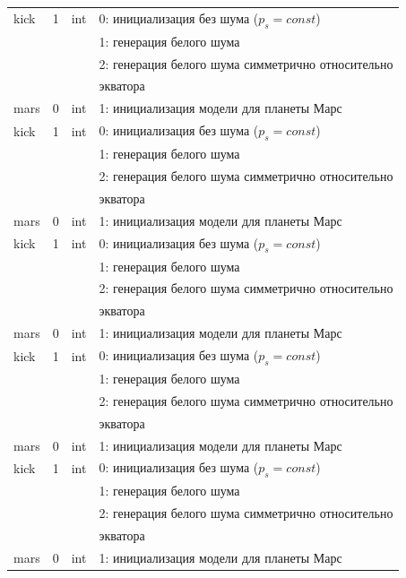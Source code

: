 \begin{longtable}[c]{|l|c|l|l|}
    kick     & 1      & int & 0: инициализация без шума (\(p_s = const\))       \\
             &        &     & 1: генерация белого шума                          \\
             &        &     & 2: генерация белого шума симметрично относительно \\
             &        &     & экватора                                          \\
    mars     & 0      & int & 1: инициализация модели для планеты Марс          \\
    kick     & 1      & int & 0: инициализация без шума (\(p_s = const\))       \\
             &        &     & 1: генерация белого шума                          \\
             &        &     & 2: генерация белого шума симметрично относительно \\
             &        &     & экватора                                          \\
    mars     & 0      & int & 1: инициализация модели для планеты Марс          \\
    kick     & 1      & int & 0: инициализация без шума (\(p_s = const\))       \\
             &        &     & 1: генерация белого шума                          \\
             &        &     & 2: генерация белого шума симметрично относительно \\
             &        &     & экватора                                          \\
    mars     & 0      & int & 1: инициализация модели для планеты Марс          \\
    kick     & 1      & int & 0: инициализация без шума (\(p_s = const\))       \\
             &        &     & 1: генерация белого шума                          \\
             &        &     & 2: генерация белого шума симметрично относительно \\
             &        &     & экватора                                          \\
    mars     & 0      & int & 1: инициализация модели для планеты Марс          \\
    kick     & 1      & int & 0: инициализация без шума (\(p_s = const\))       \\
             &        &     & 1: генерация белого шума                          \\
             &        &     & 2: генерация белого шума симметрично относительно \\
             &        &     & экватора                                          \\
    mars     & 0      & int & 1: инициализация модели для планеты Марс          \\
\end{longtable}
\normalsize%
\endgroup

